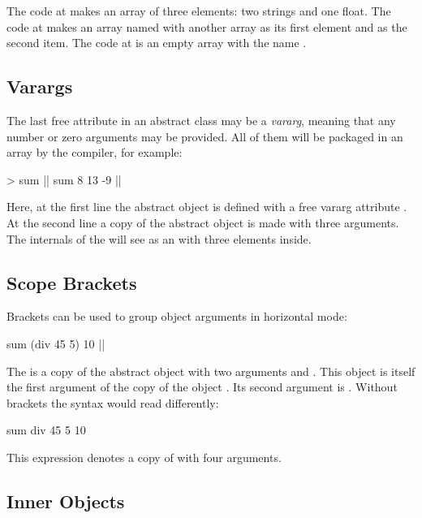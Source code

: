 The code at  makes an array of three elements: two strings
and one float. The code at  makes an array named  with another
array as its first element and  as the second item.
The code at  is an empty array with the name .

\subsection{Varargs}

The last free attribute in an abstract class may be a \emph{vararg},
meaning that any number or zero arguments may be provided. All of them
will be packaged in an array by the compiler, for example:

\begin{ffcode}
[x...] > sum |$\label{ln:sum-def}$|
sum 8 13 -9 |$\label{ln:sum-instance}$|
\end{ffcode}

Here, at the first line the abstract object  is defined
with a free vararg attribute . At the second line a copy of the
abstract object is made with three arguments. The internals of
the  will see  as an  with three
elements inside.

\subsection{Scope Brackets}

Brackets can be used to group object arguments in horizontal mode:

\begin{ffcode}
sum (div 45 5) 10  |$\label{ln:sum}$|
\end{ffcode}

The  is a copy of the abstract object 
with two arguments  and . This object is itself
the first argument of the copy of the object . Its second
argument is . Without brackets the syntax would read differently:

\begin{ffcode}
sum div 45 5 10
\end{ffcode}

This expression denotes a copy of  with four arguments.

\subsection{Inner Objects}

